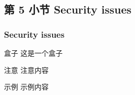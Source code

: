 \documentclass[
    aspectratio=169,                   %
]{beamer}
\begin{document}
\subsection{第 5 小节 Security issues}

    \begin{frame}
        \frametitle{Security issues}
        
        \begin{block}{盒子}
            这是一个盒子\cite{novo}
        \end{block}

        \begin{alertblock}{注意}
            注意内容
        \end{alertblock}

        \begin{exampleblock}{示例}
            示例内容
        \end{exampleblock}
    \end{frame}




        
\end{document}
